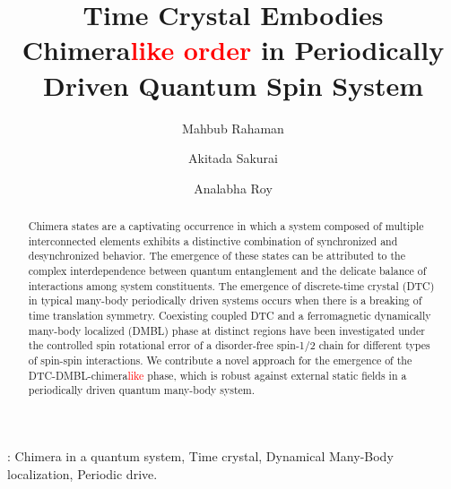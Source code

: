 \documentclass[12pt]{iopart}
\newcommand{\red}[1]{\textcolor{red}{#1}}
\begin{document}
	
\title{Time Crystal Embodies Chimera\red{like order} in Periodically Driven Quantum Spin System}
\submitto{\NJP}
\author{Mahbub Rahaman}
\address{Department of Physics, The University of Burdwan, Burdwan 713104, India}	
\author{Akitada Sakurai}
\address{Quantum Information Science and Technology Unit, Okinawa Institute of Science and Technology Graduate University, Onna-son, Okinawa 904-0495, Japan}		
\author{Analabha Roy}
\address{Department of Physics, The University of Burdwan, Burdwan 713104, India}

\begin{abstract}
	Chimera states are a captivating occurrence in which a system composed of multiple interconnected elements exhibits a distinctive combination of synchronized and desynchronized behavior. The emergence of these states can be attributed to the complex interdependence between quantum entanglement and the delicate balance of interactions among system constituents. The emergence of discrete-time crystal (DTC) in typical many-body periodically driven systems occurs when there is a breaking of time translation symmetry. Coexisting coupled DTC and a ferromagnetic dynamically many-body localized (DMBL) phase at distinct regions have been investigated under the controlled spin rotational error of a disorder-free spin-1/2 chain for different types of spin-spin interactions. We contribute a novel approach for the emergence of the DTC-DMBL-chimera\red{like} phase, which is robust against external static fields in a periodically driven quantum many-body system.
\end{abstract}
: Chimera in a quantum system, Time crystal, Dynamical Many-Body localization, Periodic drive. \\        
\maketitle
	
	
\end{document}
